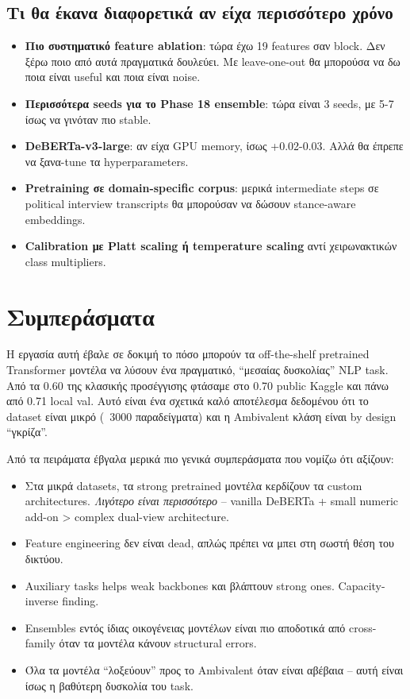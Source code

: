 \documentclass[12pt]{fphw}
\begin{document}
\subsection{Τι θα έκανα διαφορετικά αν είχα περισσότερο χρόνο}

\begin{itemize}
    \item \textbf{Πιο συστηματικό feature ablation}: τώρα έχω 19 features σαν block. Δεν ξέρω ποιο από αυτά πραγματικά δουλεύει. Με leave-one-out θα μπορούσα να δω ποια είναι useful και ποια είναι noise.
    \item \textbf{Περισσότερα seeds για το Phase 18 ensemble}: τώρα είναι 3 seeds, με 5-7 ίσως να γινόταν πιο stable.
    \item \textbf{DeBERTa-v3-large}: αν είχα GPU memory, ίσως +0.02-0.03. Αλλά θα έπρεπε να ξανα-tune τα hyperparameters.
    \item \textbf{Pretraining σε domain-specific corpus}: μερικά intermediate steps σε political interview transcripts θα μπορούσαν να δώσουν stance-aware embeddings.
    \item \textbf{Calibration με Platt scaling ή temperature scaling} αντί χειρωνακτικών class multipliers.
\end{itemize}

\section{Συμπεράσματα}

Η εργασία αυτή έβαλε σε δοκιμή το πόσο μπορούν τα off-the-shelf pretrained Transformer μοντέλα να λύσουν ένα πραγματικό, ``μεσαίας δυσκολίας'' NLP task. Από τα 0.60 της κλασικής προσέγγισης φτάσαμε στο 0.70 public Kaggle και πάνω από 0.71 local val. Αυτό είναι ένα σχετικά καλό αποτέλεσμα δεδομένου ότι το dataset είναι μικρό (~3000 παραδείγματα) και η Ambivalent κλάση είναι by design ``γκρίζα''.

Από τα πειράματα έβγαλα μερικά πιο γενικά συμπεράσματα που νομίζω ότι αξίζουν:

\begin{itemize}
    \item Στα μικρά datasets, τα strong pretrained μοντέλα κερδίζουν τα custom architectures. \emph{Λιγότερο είναι περισσότερο} -- vanilla DeBERTa + small numeric add-on > complex dual-view architecture.
    \item Feature engineering δεν είναι dead, απλώς πρέπει να μπει στη σωστή θέση του δικτύου.
    \item Auxiliary tasks helps weak backbones και βλάπτουν strong ones. Capacity-inverse finding.
    \item Ensembles εντός ίδιας οικογένειας μοντέλων είναι πιο αποδοτικά από cross-family όταν τα μοντέλα κάνουν structural errors.
    \item Όλα τα μοντέλα ``λοξεύουν'' προς το Ambivalent όταν είναι αβέβαια -- αυτή είναι ίσως η βαθύτερη δυσκολία του task.
\end{itemize}
\end{document}
